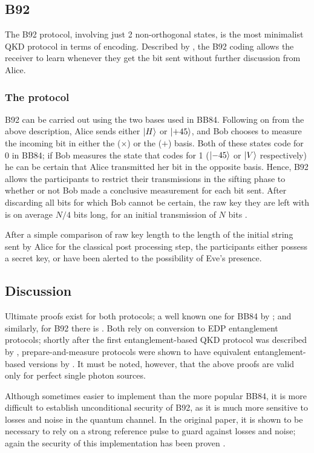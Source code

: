 \documentclass[paper=a4, fontsize=11pt]{scrartcl} %
\numberwithin{equation}{section} %
\numberwithin{figure}{section} %
\numberwithin{table}{section} %
\begin{document}
\subsection{B92}
The B92 protocol, involving just 2 non-orthogonal states, is the
most minimalist QKD protocol in terms of encoding. Described by \citet{B92},
the B92 coding allows the receiver to learn whenever they get
the bit sent without further discussion from Alice.

\subsubsection*{The protocol}
B92 can be carried out using the two bases used in BB84. Following on from the above description, Alice sends either
$\ket{H}$ or $\ket{+45}$, and Bob chooses to measure the incoming bit in either the ($\times$) or the ($+$)
basis. Both of these states code for 0 in BB84; if Bob measures the state that codes for 1 ($\ket{-45}$ or
$\ket{V}$ respectively) he can be certain that Alice transmitted her bit in the opposite basis. Hence, B92
allows the participants to restrict their transmissions in the sifting phase to whether or not Bob made
a conclusive measurement for each bit sent. After discarding all bits for which Bob cannot be certain, the raw
key they are left with is on average $N/4$ bits long, for an initial transmission of $N$ bits \citep{B92}.

After a simple comparison of raw key length to the length of the initial string sent by Alice for the classical
post processing step, the participants either possess a secret key, or have been alerted to the possibility
of Eve's presence.

\subsection{Discussion}
Ultimate proofs exist for both protocols; a well known one for BB84
by \citet{proofBB84}; and similarly, for B92 there is \citet{tamakiProofB92}. Both rely on
conversion to EDP entanglement protocols; shortly after the first entanglement-based QKD protocol was
described by \citet{E91}, prepare-and-measure protocols were shown to have equivalent entanglement-based
versions by \citet{edpEquivProof}. It must be noted, however, that the above proofs are valid only
for perfect single photon sources.

Although sometimes easier to implement than the more popular BB84, it is more difficult to establish
unconditional security of B92, as it is much more sensitive to losses and noise in the
quantum channel. In the original paper, it is shown to be necessary
to rely on a strong reference pulse to guard against
losses and noise; again the security of this implementation has been proven
\citep{tamakiStrongRefProofB92}.
\end{document}
